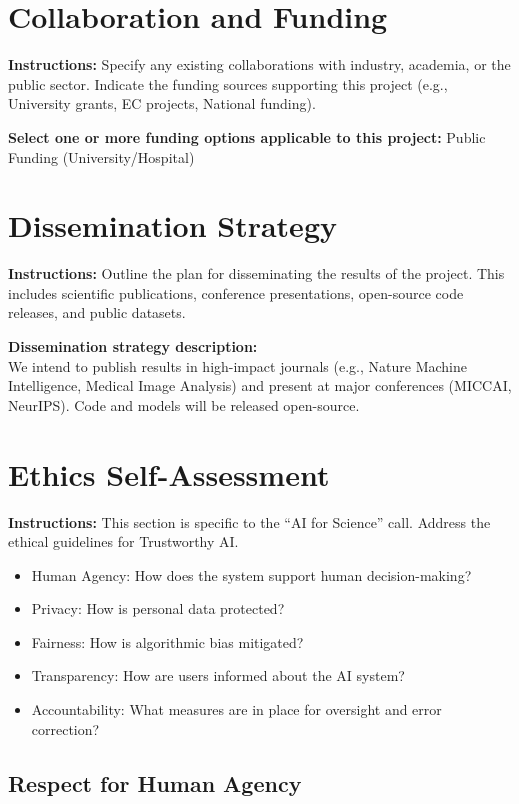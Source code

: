 \documentclass[12pt,a4paper]{article}
\begin{document}
\section*{Collaboration and Funding}

\textbf{Instructions:} Specify any existing collaborations with industry, academia, or the public sector. Indicate the funding sources supporting this project (e.g., University grants, EC projects, National funding).

\textbf{Select one or more funding options applicable to this project:} Public Funding (University/Hospital)

\section*{Dissemination Strategy}

\textbf{Instructions:} Outline the plan for disseminating the results of the project. This includes scientific publications, conference presentations, open-source code releases, and public datasets.

\textbf{Dissemination strategy description:} \\
We intend to publish results in high-impact journals (e.g., Nature Machine Intelligence, Medical Image Analysis) and present at major conferences (MICCAI, NeurIPS). Code and models will be released open-source.

\section*{Ethics Self-Assessment}

\textbf{Instructions:} This section is specific to the ``AI for Science'' call. Address the ethical guidelines for Trustworthy AI.
\begin{itemize}
    \item Human Agency: How does the system support human decision-making?
    \item Privacy: How is personal data protected?
    \item Fairness: How is algorithmic bias mitigated?
    \item Transparency: How are users informed about the AI system?
    \item Accountability: What measures are in place for oversight and error correction?
\end{itemize}

\subsection*{Respect for Human Agency}
\end{document}
